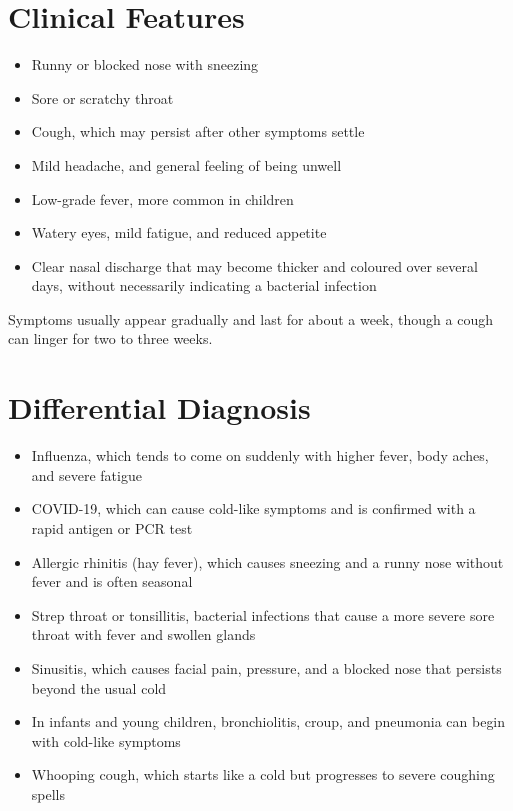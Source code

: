 \section*{Clinical Features}
\begin{itemize}
    \item Runny or blocked nose with sneezing
    \item Sore or scratchy throat
    \item Cough, which may persist after other symptoms settle
    \item Mild headache, and general feeling of being unwell
    \item Low-grade fever, more common in children
    \item Watery eyes, mild fatigue, and reduced appetite
    \item Clear nasal discharge that may become thicker and coloured over several days, without necessarily indicating a bacterial infection
\end{itemize}

Symptoms usually appear gradually and last for about a week, though a cough can linger for two to three weeks.

\section*{Differential Diagnosis}
\begin{itemize}
    \item Influenza, which tends to come on suddenly with higher fever, body aches, and severe fatigue
    \item COVID-19, which can cause cold-like symptoms and is confirmed with a rapid antigen or PCR test
    \item Allergic rhinitis (hay fever), which causes sneezing and a runny nose without fever and is often seasonal
    \item Strep throat or tonsillitis, bacterial infections that cause a more severe sore throat with fever and swollen glands
    \item Sinusitis, which causes facial pain, pressure, and a blocked nose that persists beyond the usual cold
    \item In infants and young children, bronchiolitis, croup, and pneumonia can begin with cold-like symptoms
    \item Whooping cough, which starts like a cold but progresses to severe coughing spells
\end{itemize}

